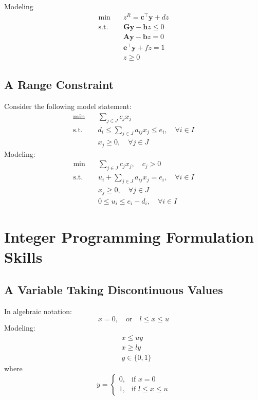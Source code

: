 					Modeling
					\begin{align}
						\min \quad & z^R = \mathbf{c^\top y} + dz\\
						\text{s.t.} \quad & \mathbf{Gy} - \mathbf{h}z \le 0\\
										  & \mathbf{Ay} - \mathbf{b}z = 0\\
										  & \mathbf{e^\top y} + fz = 1\\
										  & z \ge 0
					\end{align}

				\subsection{A Range Constraint}
					Consider the following model statement:
					\begin{align}
						\min \quad & \sum_{j\in J}c_jx_j \\
						\text{s.t.} \quad & d_i\le \sum_{j\in J}a_{ij}x_j \le e_i, \quad \forall i\in I \\
						                  & x_j \ge 0, \quad \forall j\in J 
					\end{align}
					Modeling:
					\begin{align}
						\min \quad & \sum_{j\in J}c_jx_j, \quad c_j > 0 \\
						\text{s.t.} \quad & u_i + \sum_{j\in J}a_{ij}x_j = e_i, \quad \forall i\in I \\
						                  & x_j \ge 0, \quad \forall j\in J \\
						                  & 0\le u_i \le e_i-d_i, \quad \forall i\in I 
					\end{align}

			\section{Integer Programming Formulation Skills}
				\subsection{A Variable Taking Discontinuous Values}
					In algebraic notation: 
					\begin{equation}
						x = 0,\quad \text{or} \quad l\le x \le u 
					\end{equation}
					Modeling:
					\begin{align}
						& x \le uy \\
						& x \ge ly  \\
						& y \in \{0, 1\} 
					\end{align}
					where
					\begin{equation}y=\begin{cases}0, & \text{if }x=0 \\ 1, & \text{if } l\le x \le u\end{cases} \end{equation}

